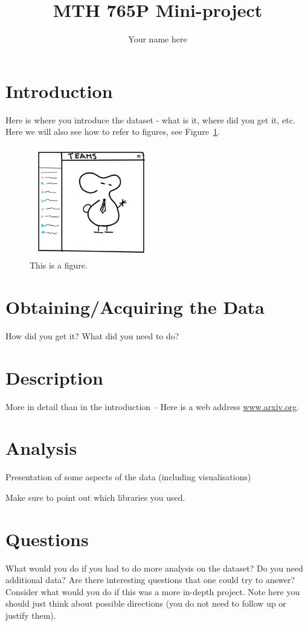\documentclass{article}
\title{MTH 765P Mini-project}
\author{Your name here}
\date{}
\begin{document}
\maketitle
\section{Introduction}
Here is where you introduce the dataset - what is it, where did you get it, etc. Here we will also see how to refer to figures, see Figure~\ref{figure1}.

\begin{figure}[htbp]
    \centering\includegraphics[width=0.5\textwidth]{teams.png}
    \caption{\label{figure1} This is a figure.}
 \end{figure}

 \section{Obtaining/Acquiring the Data}
 How did you get it? What did you need to do?


 \section{Description}
 More in detail than in the introduction -- Here is a web address \url{www.arxiv.org}.
 
 \section{Analysis}
Presentation of some aspects of the data (including visualisations)

Make sure to point out which libraries you used.

\section{Questions}
What would you do if you had to do more analysis on the dataset? Do you need additional data? Are there interesting questions that one could try to answer? 
Consider what would you do if this was a more in-depth project. Note here you should just think about possible directions (you do not need to follow up or 
justify them).
\end{document}
